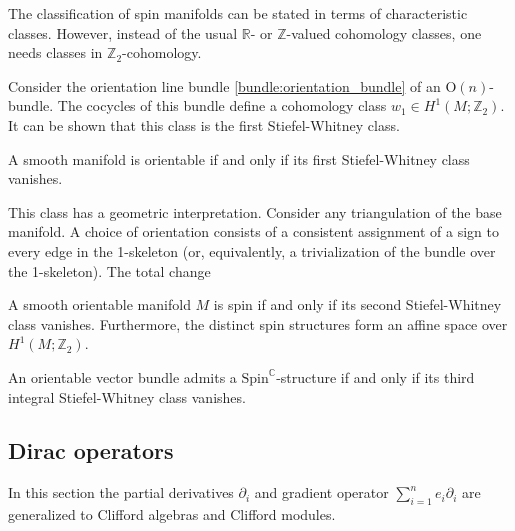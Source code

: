     The classification of spin manifolds can be stated in terms of characteristic classes. However, instead of the usual $\mathbb{R}$- or $\mathbb{Z}$-valued cohomology classes, one needs classes in $\mathbb{Z}_2$-cohomology.
    \begin{property}
        Consider the orientation line bundle \ref{bundle:orientation_bundle} of an $\mathrm{O}(n)$-bundle. The cocycles of this bundle define a cohomology class $w_1\in H^1(M;\mathbb{Z}_2)$. It can be shown that this class is the first Stiefel-Whitney class.
    \end{property}
    \begin{result}[Orientability]
        A smooth manifold is orientable if and only if its first Stiefel-Whitney class vanishes.

        This class has a geometric interpretation. Consider any triangulation of the base manifold. A choice of orientation consists of a consistent assignment of a sign to every edge in the 1-skeleton (or, equivalently, a trivialization of the bundle over the 1-skeleton). The total change
    \end{result}
    \begin{property}
        A smooth orientable manifold $M$ is spin if and only if its second Stiefel-Whitney class vanishes. Furthermore, the distinct spin structures form an affine space over $H^1(M;\mathbb{Z}_2)$.
    \end{property}

    \begin{property}\label{riemann:spin_c}
        An orientable vector bundle admits a $\mathrm{Spin}^\mathbb{C}$-structure if and only if its third integral Stiefel-Whitney class vanishes.
    \end{property}

\subsection{Dirac operators}

    In this section the partial derivatives $\partial_i$ and gradient operator $\sum_{i=1}^ne_i\partial_i$ are generalized to Clifford algebras and Clifford modules.

